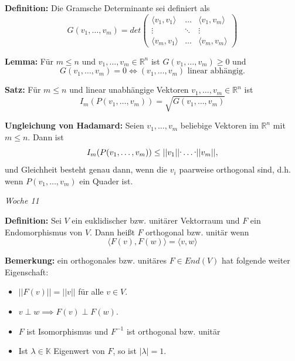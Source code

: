 \documentclass{article}
\let\oldcdot\cdot
\renewcommand{\cdot}{\raisebox{0.1ex}{$\oldcdot$}}
\begin{document}
\textbf{Definition:} Die Gramsche Determinante sei definiert als
\begin{equation*}
	G(v_1,\dots,v_m)=det
	\begin{pmatrix}
		\langle v_1, v_1\rangle&\dots & \langle v_1, v_m\rangle \\
		\vdots & \ddots & \vdots\\
		\langle v_m, v_1\rangle&\dots &\langle v_m, v_m\rangle
	\end{pmatrix}
\end{equation*}

\textbf{Lemma:} Für $m\leq n$ und $v_1,\dots,v_m\in\mathbb{R}^n$ ist
$G(v_1,\dots,v_m)\geq 0$ und
\begin{equation*}
 G(v_1,\dots,v_m)=0\iff(v_1,\dots,v_m) \text{  linear abhängig.}
\end{equation*}

\textbf{Satz:} Für $m\leq n$ und linear unabhängige Vektoren $v_1,\dots,
v_m\in\mathbb{R}^n$ ist
\begin{equation*}
	I_m(P(v_1,\dots, v_m))=\sqrt{G(v_1,\dots, v_m)}
\end{equation*}

\textbf{Ungleichung von Hadamard:} Seien $v_1,\dots, v_m$ beliebige Vektoren im
$\mathbb{R}^n$ mit $m\leq n$. Dann ist 
\begin{equation*}
	I_m(P(v_1,\dots, v_m))\leq ||v_1||\cdot\dots\cdot||v_m||,
\end{equation*}
und Gleichheit besteht genau dann, wenn die $v_i$ paarweise orthogonal sind,
d.h. wenn $P(v_1,\dots,v_m)$ ein Quader ist.

\textit{\small \hspace{-1.5cm}Woche 11}


\textbf{Definition:} Sei $V$ ein euklidischer bzw. unitärer Vektorraum und $F$
ein Endomorphismus von $V$. Dann heißt $F$ orthogonal bzw. unitär wenn
\begin{equation*}
	\langle F(v),F(w)\rangle = \langle v,w\rangle
\end{equation*}

\textbf{Bemerkung:} ein orthogonales bzw. unitäres $F\in End(V)$ hat folgende
weiter Eigenschaft:

\begin{itemize}
\item[a)] $||F(v)||=||v||$ für alle $v\in V$.
\item[b)] $v\perp w\implies F(v)\perp F(w)$.
\item[c)] $F$ ist Isomorphismus und $F^{-1}$ ist orthogonal bzw. unitär
\item[d)] Ist $\lambda\in\mathbb{K}$ Eigenwert von $F$, so ist $|\lambda|=1$.
\end{itemize}
\end{document}
